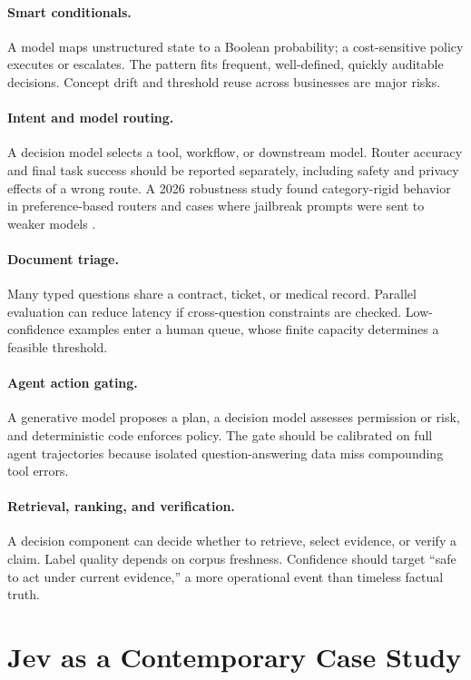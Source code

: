 \documentclass[11pt]{article}
\begin{document}
\paragraph{Smart conditionals.} A model maps unstructured state to a Boolean probability; a cost-sensitive policy executes or escalates. The pattern fits frequent, well-defined, quickly auditable decisions. Concept drift and threshold reuse across businesses are major risks.

\paragraph{Intent and model routing.} A decision model selects a tool, workflow, or downstream model. Router accuracy and final task success should be reported separately, including safety and privacy effects of a wrong route. A 2026 robustness study found category-rigid behavior in preference-based routers and cases where jailbreak prompts were sent to weaker models \cite{kassem2026routerfragility}.

\paragraph{Document triage.} Many typed questions share a contract, ticket, or medical record. Parallel evaluation can reduce latency if cross-question constraints are checked. Low-confidence examples enter a human queue, whose finite capacity determines a feasible threshold.

\paragraph{Agent action gating.} A generative model proposes a plan, a decision model assesses permission or risk, and deterministic code enforces policy. The gate should be calibrated on full agent trajectories because isolated question-answering data miss compounding tool errors.

\paragraph{Retrieval, ranking, and verification.} A decision component can decide whether to retrieve, select evidence, or verify a claim. Label quality depends on corpus freshness. Confidence should target ``safe to act under current evidence,'' a more operational event than timeless factual truth.

\section{Jev as a Contemporary Case Study}
\end{document}
